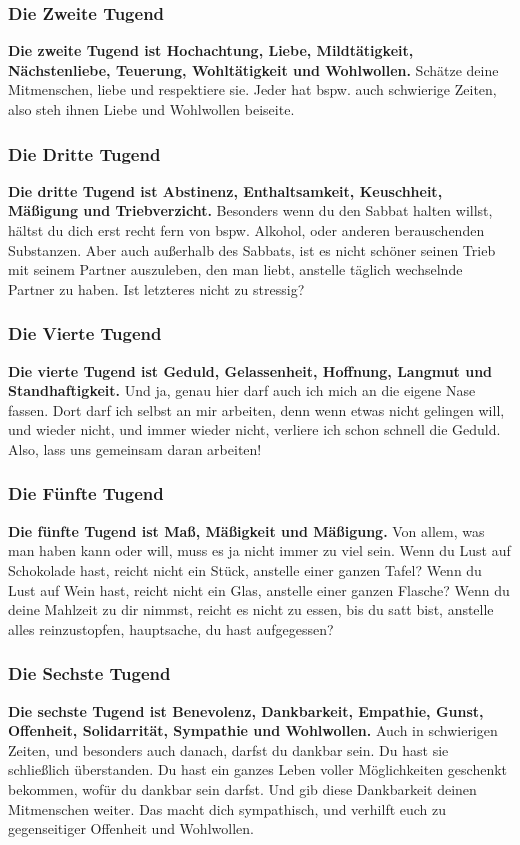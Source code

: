 \documentclass[10pt,a5paper]{article}
\begin{document}
	\subsubsection{Die Zweite Tugend}
		\textbf{Die zweite Tugend ist Hochachtung,
		Liebe,
		Mildt\"atigkeit,
		N\"achstenliebe,
		Teuerung,
		Wohlt\"atigkeit
		und Wohlwollen.}
		Sch\"atze deine Mitmenschen,
		liebe und respektiere sie.
		Jeder hat bspw. auch schwierige Zeiten,
		also steh ihnen Liebe und Wohlwollen beiseite.
	
	\subsubsection{Die Dritte Tugend}
		\textbf{Die dritte Tugend ist Abstinenz,
		Enthaltsamkeit,
		Keuschheit,
		M\"a{\ss}igung und Triebverzicht.}
		Besonders wenn du den Sabbat halten willst,
		h\"altst du dich erst recht fern von bspw. Alkohol,
		oder anderen berauschenden Substanzen.
		Aber auch au{\ss}erhalb des Sabbats,
		ist es nicht sch\"oner seinen Trieb mit seinem Partner auszuleben,
		den man liebt,
		anstelle t\"aglich wechselnde Partner zu haben.
		Ist letzteres nicht zu stressig?

	\subsubsection{Die Vierte Tugend}
		\textbf{Die vierte Tugend ist Geduld,
		Gelassenheit,
		Hoffnung,
		Langmut und Standhaftigkeit.}
		Und ja,
		genau hier darf auch ich mich an die eigene Nase fassen.
		Dort darf ich selbst an mir arbeiten,
		denn wenn etwas nicht gelingen will,
		und wieder nicht,
		und immer wieder nicht,
		verliere ich schon schnell die Geduld.
		Also,
		lass uns gemeinsam daran arbeiten!

	\subsubsection{Die F\"unfte Tugend}
		\textbf{Die f\"unfte Tugend ist Ma{\ss},
		M\"a{\ss}igkeit und M\"a{\ss}igung.}
		Von allem,
		was man haben kann oder will,
		muss es ja nicht immer zu viel sein.
		Wenn du Lust auf Schokolade hast,
		reicht nicht ein St\"uck,
		anstelle einer ganzen Tafel?
		Wenn du Lust auf Wein hast,
		reicht nicht ein Glas,
		anstelle einer ganzen Flasche?
		Wenn du deine Mahlzeit zu dir nimmst,
		reicht es nicht zu essen,
		bis du satt bist,
		anstelle alles reinzustopfen,
		hauptsache,
		du hast aufgegessen?		

	\subsubsection{Die Sechste Tugend}
		\textbf{Die sechste Tugend ist Benevolenz,
		Dankbarkeit,
		Empathie,
		Gunst,
		Offenheit,
		Solidarrit\"at,
		Sympathie und Wohlwollen.}
		Auch in schwierigen Zeiten,
		und besonders auch danach,
		darfst du dankbar sein.
		Du hast sie schlie{\ss}lich \"uberstanden.
		Du hast ein ganzes Leben voller M\"oglichkeiten geschenkt bekommen,
		wof\"ur du dankbar sein darfst.
		Und gib diese Dankbarkeit deinen Mitmenschen weiter.
		Das macht dich sympathisch,
		und verhilft euch zu gegenseitiger Offenheit und Wohlwollen.
	
\end{document}
